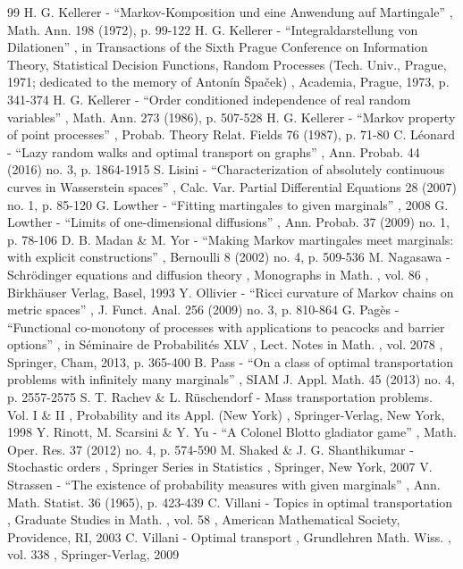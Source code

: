 \documentclass[11pt]{article}
\theoremstyle{plain}
\theoremstyle{definition}
\begin{document}
\begin{thebibliography}{99}
 H. G. Kellerer - “Markov-Komposition und eine Anwendung auf Martingale” , Math. Ann. 198 (1972), p. 99-122
 H. G. Kellerer - “Integraldarstellung von Dilationen” , in Transactions of the Sixth Prague Conference on Information Theory, Statistical Decision Functions, Random Processes (Tech. Univ., Prague, 1971; dedicated to the memory of Antonín Špaček) , Academia, Prague, 1973, p. 341-374
 H. G. Kellerer - “Order conditioned independence of real random variables” , Math. Ann. 273 (1986), p. 507-528
 H. G. Kellerer - “Markov property of point processes” , Probab. Theory Relat. Fields 76 (1987), p. 71-80
 C. Léonard - “Lazy random walks and optimal transport on graphs” , Ann. Probab. 44 (2016) no. 3, p. 1864-1915
 S. Lisini - “Characterization of absolutely continuous curves in Wasserstein spaces” , Calc. Var. Partial Differential Equations 28 (2007) no. 1, p. 85-120
 G. Lowther - “Fitting martingales to given marginals” , 2008
 G. Lowther - “Limits of one-dimensional diffusions” , Ann. Probab. 37 (2009) no. 1, p. 78-106
 D. B. Madan \& M. Yor - “Making Markov martingales meet marginals: with explicit constructions” , Bernoulli 8 (2002) no. 4, p. 509-536
 M. Nagasawa - Schrödinger equations and diffusion theory , Monographs in Math. , vol. 86 , Birkhäuser Verlag, Basel, 1993
 Y. Ollivier - “Ricci curvature of Markov chains on metric spaces” , J. Funct. Anal. 256 (2009) no. 3, p. 810-864
 G. Pagès - “Functional co-monotony of processes with applications to peacocks and barrier options” , in Séminaire de Probabilités XLV , Lect. Notes in Math. , vol. 2078 , Springer, Cham, 2013, p. 365-400
 B. Pass - “On a class of optimal transportation problems with infinitely many marginals” , SIAM J. Appl. Math. 45 (2013) no. 4, p. 2557-2575
 S. T. Rachev \& L. Rüschendorf - Mass transportation problems. Vol. I \& II , Probability and its Appl. (New York) , Springer-Verlag, New York, 1998
 Y. Rinott, M. Scarsini \& Y. Yu - “A Colonel Blotto gladiator game” , Math. Oper. Res. 37 (2012) no. 4, p. 574-590
 M. Shaked \& J. G. Shanthikumar - Stochastic orders , Springer Series in Statistics , Springer, New York, 2007
 V. Strassen - “The existence of probability measures with given marginals” , Ann. Math. Statist. 36 (1965), p. 423-439
 C. Villani - Topics in optimal transportation , Graduate Studies in Math. , vol. 58 , American Mathematical Society, Providence, RI, 2003
 C. Villani - Optimal transport , Grundlehren Math. Wiss. , vol. 338 , Springer-Verlag, 2009
\end{thebibliography}
\end{document}
